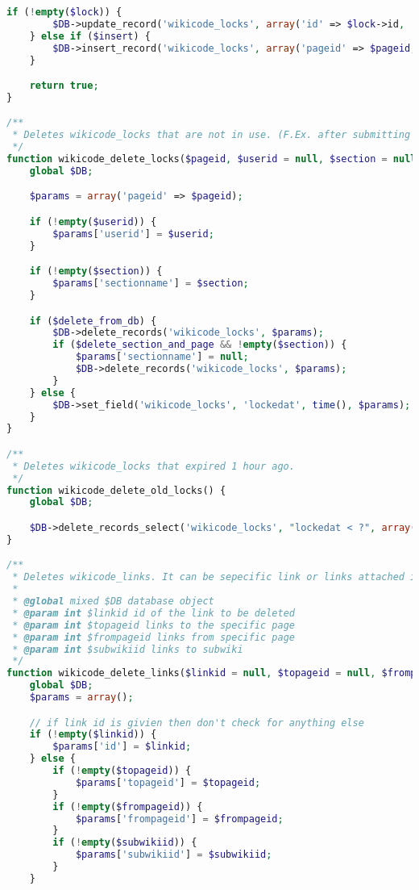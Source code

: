 \begin{lstlisting}[language=PHP]
    if (!empty($lock)) {
        $DB->update_record('wikicode_locks', array('id' => $lock->id, 'lockedat' => time() + LOCK_TIMEOUT));
    } else if ($insert) {
        $DB->insert_record('wikicode_locks', array('pageid' => $pageid, 'sectionname' => $section, 'userid' => $userid, 'lockedat' => time() + 30));
    }

    return true;
}

/**
 * Deletes wikicode_locks that are not in use. (F.Ex. after submitting the changes). If no userid is present, it deletes ALL the wikicode_locks of a specific page.
 */
function wikicode_delete_locks($pageid, $userid = null, $section = null, $delete_from_db = true, $delete_section_and_page = false) {
    global $DB;

    $params = array('pageid' => $pageid);

    if (!empty($userid)) {
        $params['userid'] = $userid;
    }

    if (!empty($section)) {
        $params['sectionname'] = $section;
    }

    if ($delete_from_db) {
        $DB->delete_records('wikicode_locks', $params);
        if ($delete_section_and_page && !empty($section)) {
            $params['sectionname'] = null;
            $DB->delete_records('wikicode_locks', $params);
        }
    } else {
        $DB->set_field('wikicode_locks', 'lockedat', time(), $params);
    }
}

/**
 * Deletes wikicode_locks that expired 1 hour ago.
 */
function wikicode_delete_old_locks() {
    global $DB;

    $DB->delete_records_select('wikicode_locks', "lockedat < ?", array(time() - 3600));
}

/**
 * Deletes wikicode_links. It can be sepecific link or links attached in subwiki
 *
 * @global mixed $DB database object
 * @param int $linkid id of the link to be deleted
 * @param int $topageid links to the specific page
 * @param int $frompageid links from specific page
 * @param int $subwikiid links to subwiki
 */
function wikicode_delete_links($linkid = null, $topageid = null, $frompageid = null, $subwikiid = null) {
    global $DB;
    $params = array();

    // if link id is givien then don't check for anything else
    if (!empty($linkid)) {
        $params['id'] = $linkid;
    } else {
        if (!empty($topageid)) {
            $params['topageid'] = $topageid;
        }
        if (!empty($frompageid)) {
            $params['frompageid'] = $frompageid;
        }
        if (!empty($subwikiid)) {
            $params['subwikiid'] = $subwikiid;
        }
    }


\end{lstlisting}
